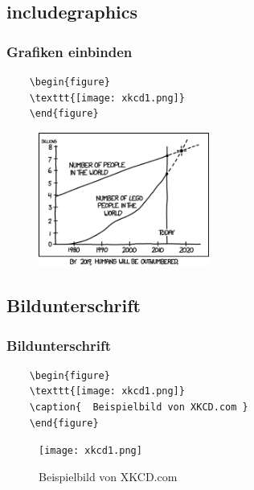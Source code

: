 \subsection{includegraphics}
\begin{frame}[fragile]
\frametitle{Grafiken einbinden}
\begin{codeblock}
  \begin{verbatim}
    \begin{figure}
    \texttt{[image: xkcd1.png]}
    \end{figure}
  \end{verbatim}
\end{codeblock}
\pause 
 \begin{figure}
      \includegraphics[width=0.5\textwidth]{images/xkcd1.png}
 \end{figure}
\end{frame}

\subsection{Bildunterschrift}
\begin{frame}[fragile]
\frametitle{Bildunterschrift}
 
\begin{codeblock}
 

  \begin{verbatim}
    \begin{figure}
    \texttt{[image: xkcd1.png]}
    \caption{  Beispielbild von XKCD.com }
    \end{figure}
  \end{verbatim}
\end{codeblock}
    \begin{figure}
      \texttt{[image: xkcd1.png]}
      \caption{Beispielbild von XKCD.com}
    \end{figure}
\end{frame}

